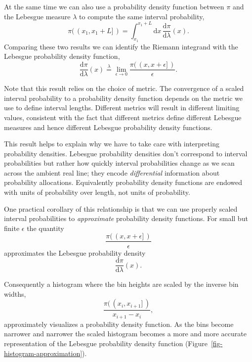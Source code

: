 \documentclass[
  letterpaper,
  DIV=11,
  numbers=noendperiod]{scrartcl}
\begin{document}
At the same time we can also use a probability density function between
\(\pi\) and the Lebesgue measure \(\lambda\) to compute the same
interval probability, \[
\pi( \, ( x_{1}, x_{1} + L ] \, ) =
\int_{x_{1}}^{x_{1} + L} \mathrm{d} x \,
\frac{ \mathrm{d} \pi }{ \mathrm{d} \lambda }(x).
\] Comparing these two results we can identify the Riemann integrand
with the Lebesgue probability density function, \[
\frac{ \mathrm{d} \pi }{ \mathrm{d} \lambda }(x)
\overset{\lambda}{=}
\lim_{\epsilon \rightarrow 0}
\frac{ \pi( \, ( x, x + \epsilon ] \, ) }{ \epsilon }.
\]

Note that this result relies on the choice of metric. The convergence of
a scaled interval probability to a probability density function depends
on the metric we use to define interval lengths. Different metrics will
result in different limiting values, consistent with the fact that
different metrics define different Lebesgue measures and hence different
Lebesgue probability density functions.

This result helps to explain why we have to take care with interpreting
probability densities. Lebesgue probability densities don't correspond
to interval probabilities but rather how quickly interval probabilities
change as we scan across the ambient real line; they encode
\emph{differential} information about probability allocations.
Equivalently probability density functions are endowed with units of
probability over length, not units of probability.

One practical corollary of this relationship is that we can use properly
scaled interval probabilities to \emph{approximate} probability density
functions. For small but finite \(\epsilon\) the quantity \[
\frac{ \pi( \, ( x, x + \epsilon ] \, ) }{ \epsilon }
\] approximates the Lebesgue probability density \[
\frac{ \mathrm{d} \pi }{ \mathrm{d} \lambda }(x).
\]

Consequently a histogram where the bin heights are scaled by the inverse
bin widths, \[
\frac{ \pi( \, ( x_{i}, x_{i + 1} ] \, ) }{ x_{i + 1} - x_{i} },
\] approximately visualizes a probability density function. As the bins
become narrower and narrower the scaled histogram becomes a more and
more accurate representation of the Lebesgue probability density
function (Figure~\ref{fig-histogram-approximation}).
\end{document}
